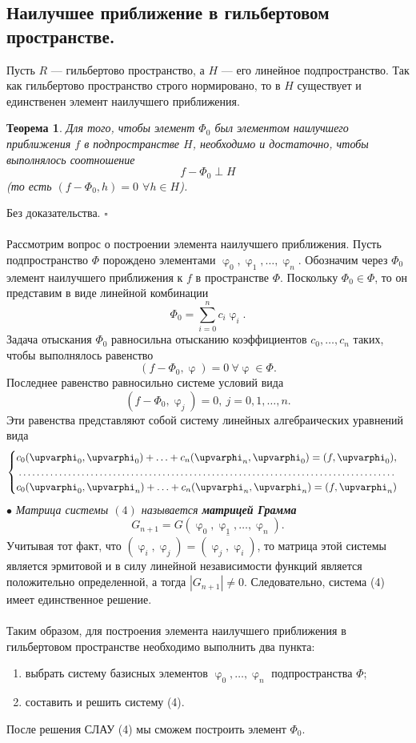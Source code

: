 \documentclass[a4paper, 12pt]{report}
\numberwithin{equation}{section}
\newenvironment{Proof} %
{\par\noindent{$\blacklozenge$}} %
{\hfill$\scriptstyle\square$}
\renewcommand{\varphi}{\upvarphi}
\newtheorem*{theorem}{Теорема}
\begin{document}
 \subsection{Наилучшее приближение в гильбертовом пространстве.}
 Пусть $R$ --- гильбертово пространство, а $H$ --- его линейное подпространство. Так как гильбертово пространство строго нормировано, то в $H$ существует и единственен элемент наилучшего приближения. 
 \begin{theorem}
 	Для того, чтобы элемент $\Phi_0$ был элементом наилучшего приближения $f$ в подпространстве $H$, необходимо и достаточно, чтобы выполнялось соотношение $$f - \Phi_0 \perp H$$
 	(то есть $(f - \Phi_0, h) = 0$ $\forall h \in H$).
 \end{theorem}
 \begin{Proof}
 	Без доказательства.
 \end{Proof}\\\\
 Рассмотрим вопрос о построении элемента наилучшего приближения.
 Пусть подпространство $\Phi$ порождено элементами $\varphi_0,\varphi_1,\ldots, \varphi_n$. Обозначим через $\Phi_0$ элемент наилучшего приближения к $f$ в пространстве $\Phi$. Поскольку $\Phi_0 \in \Phi$, то он представим в виде линейной комбинации $$\Phi_0 = \sum_{i=0}^{n}c_i\varphi_i.$$
 Задача отыскания $\Phi_0$ равносильна отысканию коэффициентов $c_0,\ldots, c_n$ таких, чтобы выполнялось равенство $$(f-\Phi_0, \varphi) = 0\ \forall \varphi \in \Phi.$$
 Последнее равенство равносильно системе условий вида $$(f-\Phi_0, \varphi_j) = 0,\ j = 0,1,\ldots, n.$$
 Эти равенства представляют собой систему линейных алгебраических уравнений вида 
 \begin{equation}
 	\begin{cases}
 	c_0(\varphi_0,\varphi_0) + \ldots + c_n(\varphi_n, \varphi_0) = (f,\varphi_0),\\
 	\dotfill\\
 	c_0(\varphi_0,\varphi_n) + \ldots + c_n(\varphi_n, \varphi_n) = (f,\varphi_n)
 \end{cases}
 \end{equation}
 $\bullet$ \textit{Матрица системы $(4)$ называется \textbf{матрицей Грамма}} $$G_{n+1} = G(\varphi_0,\varphi_1,\ldots, \varphi_n).$$
 Учитывая тот факт, что $(\varphi_i, \varphi_j) = \overline{(\varphi_j, \varphi_i)}$, то матрица этой системы является эрмитовой и в силу линейной независимости функций является положительно определенной, а тогда $|G_{n+1}|\ne 0$. Следовательно, система (4) имеет единственное решение.\\\\
 Таким образом, для построения элемента наилучшего приближения в гильбертовом пространстве необходимо выполнить два пункта: \begin{enumerate}
 	\item выбрать систему базисных элементов $\varphi_0,\ldots, \varphi_n$ подпространства $\Phi$;
 	\item составить и решить систему (4).
 \end{enumerate}
 После решения СЛАУ (4) мы сможем построить элемент $\Phi_0$.
\end{document}
